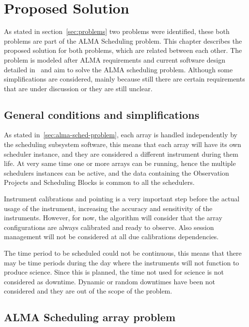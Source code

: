 \chapter{Proposed Solution}

As stated in section~\ref{sec:problems} two problems were identified, these both problems are part of the ALMA Scheduling problem.
This chapter describes the proposed solution for both problems, which are related between each other.
The problem is modeled after ALMA requirements and current software design detailed in~\cite{avarias11,clarke12,schwarz04,apdm-model} and aim to solve
the ALMA scheduling problem. Although some simplifications are considered, mainly because still there are certain requirements that are under discussion or they are still unclear. 

\section{General conditions and simplifications}

As stated in~\ref{sec:alma-sched-problem}, each array is handled independently by the scheduling subsystem software, this means that each array will have its own scheduler instance, and they are considered a different instrument during them life. At very same time one or more arrays can be running, hence the multiple schedulers instances can be active, and the data containing the Observation Projects and Scheduling Blocks is common to all the schedulers.

Instrument calibrations and pointing is a very important step before the actual usage of the instrument, increasing the accuracy and sensitivity of the instruments. However, for now, the algorithm will consider that the array configurations are always calibrated and ready to observe. Also session management will not be considered at all due calibrations dependencies.

The time period to be scheduled could not be continuous, this means that there may be time periods during the day where the instruments will not function to produce science. Since this is planned, the time not used for science is not considered as downtime. Dynamic or random downtimes have been not considered and they are out of the scope of the problem.

\section{ALMA Scheduling array problem}


